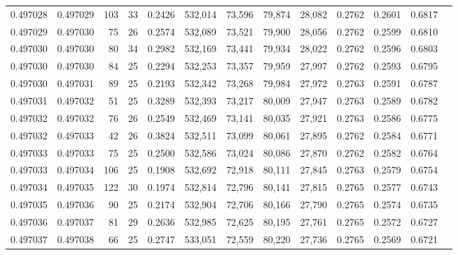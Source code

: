 \begin{tabular}{rrrrrrrrrrrrr}
0.497028 & 0.497029 & 103 &  33 &                                     0.2426 & 532,014 &  73,596 &  79,874 &  28,082 & 0.2762 & 0.2601 & 0.6817 \\
0.497029 & 0.497030 &  75 &  26 &                                     0.2574 & 532,089 &  73,521 &  79,900 &  28,056 & 0.2762 & 0.2599 & 0.6810 \\
0.497030 & 0.497030 &  80 &  34 &                                     0.2982 & 532,169 &  73,441 &  79,934 &  28,022 & 0.2762 & 0.2596 & 0.6803 \\
0.497030 & 0.497030 &  84 &  25 &                                     0.2294 & 532,253 &  73,357 &  79,959 &  27,997 & 0.2762 & 0.2593 & 0.6795 \\
0.497030 & 0.497031 &  89 &  25 &                                     0.2193 & 532,342 &  73,268 &  79,984 &  27,972 & 0.2763 & 0.2591 & 0.6787 \\
0.497031 & 0.497032 &  51 &  25 &                                     0.3289 & 532,393 &  73,217 &  80,009 &  27,947 & 0.2763 & 0.2589 & 0.6782 \\
0.497032 & 0.497032 &  76 &  26 &                                     0.2549 & 532,469 &  73,141 &  80,035 &  27,921 & 0.2763 & 0.2586 & 0.6775 \\
0.497032 & 0.497033 &  42 &  26 &                                     0.3824 & 532,511 &  73,099 &  80,061 &  27,895 & 0.2762 & 0.2584 & 0.6771 \\
0.497033 & 0.497033 &  75 &  25 &                                     0.2500 & 532,586 &  73,024 &  80,086 &  27,870 & 0.2762 & 0.2582 & 0.6764 \\
0.497033 & 0.497034 & 106 &  25 &                                     0.1908 & 532,692 &  72,918 &  80,111 &  27,845 & 0.2763 & 0.2579 & 0.6754 \\
0.497034 & 0.497035 & 122 &  30 &                                     0.1974 & 532,814 &  72,796 &  80,141 &  27,815 & 0.2765 & 0.2577 & 0.6743 \\
0.497035 & 0.497036 &  90 &  25 &                                     0.2174 & 532,904 &  72,706 &  80,166 &  27,790 & 0.2765 & 0.2574 & 0.6735 \\
0.497036 & 0.497037 &  81 &  29 &                                     0.2636 & 532,985 &  72,625 &  80,195 &  27,761 & 0.2765 & 0.2572 & 0.6727 \\
0.497037 & 0.497038 &  66 &  25 &                                     0.2747 & 533,051 &  72,559 &  80,220 &  27,736 & 0.2765 & 0.2569 & 0.6721 \\

\end{tabular}
